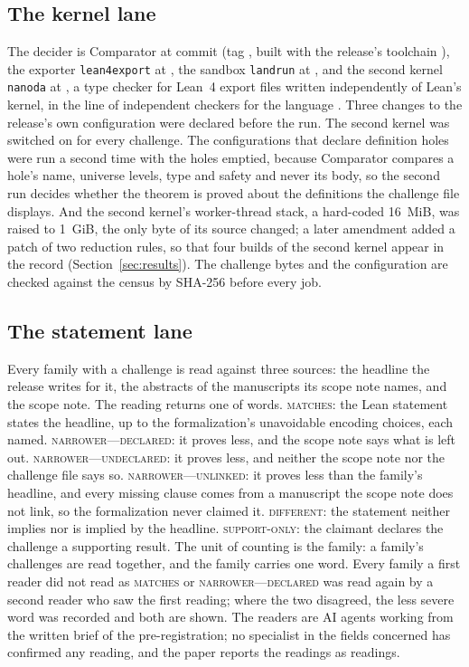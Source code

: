 \documentclass[preprint,11pt,authoryear,a4paper]{elsarticle}
\newcommand{\vword}[1]{{\normalfont\scshape #1}}
\newcommand{\wMatches}{\vword{matches}}
\newcommand{\wNarrowerDeclared}{\vword{narrower---declared}}
\newcommand{\wNarrowerUndeclared}{\vword{narrower---undeclared}}
\newcommand{\wNarrowerUnlinked}{\vword{narrower---unlinked}}
\newcommand{\wDifferent}{\vword{different}}
\newcommand{\wSupport}{\vword{support-only}}
\newcommand{\lean}[1]{\texttt{#1}}
\begin{document}
\subsection{The kernel lane}\label{sec:lanek}
The decider is Comparator at commit \OmComparatorCommit{} (tag \OmComparatorTag, built with the release's toolchain \OmLeanToolchain), the exporter \lean{lean4export} at \OmLeanExportCommit, the sandbox \lean{landrun} at \OmLandrunCommit, and the second kernel \lean{nanoda} at \OmNanodaCommit{} \citep{Nanoda}, a type checker for Lean~4 export files written independently of Lean's kernel, in the line of independent checkers for the language \citep{Carneiro24Lean4Lean}. Three changes to the release's own configuration were declared before the run. The second kernel was switched on for every challenge. The \OmDefHoleConfigs{} configurations that declare definition holes were run a second time with the holes emptied, because Comparator compares a hole's name, universe levels, type and safety and never its body, so the second run decides whether the theorem is proved about the definitions the challenge file displays. And the second kernel's worker-thread stack, a hard-coded 16~MiB, was raised to 1~GiB, the only byte of its source changed; a later amendment added a patch of two reduction rules, so that four builds of the second kernel appear in the record (Section~\ref{sec:results}). The challenge bytes and the configuration are checked against the census by SHA-256 before every job.

\subsection{The statement lane}\label{sec:lanes}
Every family with a challenge is read against three sources: the headline the release writes for it, the abstracts of the manuscripts its scope note names, and the scope note. The reading returns one of \OmLaneSWords{} words. \wMatches: the Lean statement states the headline, up to the formalization's unavoidable encoding choices, each named. \wNarrowerDeclared: it proves less, and the scope note says what is left out. \wNarrowerUndeclared: it proves less, and neither the scope note nor the challenge file says so. \wNarrowerUnlinked: it proves less than the family's headline, and every missing clause comes from a manuscript the scope note does not link, so the formalization never claimed it. \wDifferent: the statement neither implies nor is implied by the headline. \wSupport: the claimant declares the challenge a supporting result. The unit of counting is the family: a family's challenges are read together, and the family carries one word. Every family a first reader did not read as \wMatches{} or \wNarrowerDeclared{} was read again by a second reader who saw the first reading; where the two disagreed, the less severe word was recorded and both are shown. The readers are AI agents working from the written brief of the pre-registration; no specialist in the fields concerned has confirmed any reading, and the paper reports the readings as readings.
\end{document}
